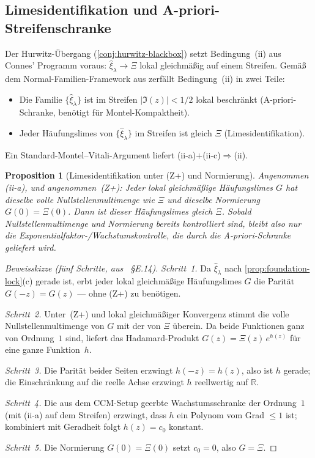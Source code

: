 \documentclass[12pt,a4paper]{article}
\newtheorem{proposition}[theorem]{Proposition}
\theoremstyle{definition}
\theoremstyle{remark}
\begin{document}
\subsection{Limesidentifikation und A-priori-Streifenschranke}
\label{subsec:iic-to-iia}

Der Hurwitz-Übergang (\cref{conj:hurwitz-blackbox}) setzt Bedingung~(ii)
aus Connes' Programm voraus: $\hat{\xi}_\lambda \to \Xi$ lokal gleichmäßig
auf einem Streifen. Gemäß dem Normal-Familien-Framework aus
\cite{Geiger2026evendom} zerfällt Bedingung~(ii) in zwei Teile:
\begin{itemize}
  \item[(ii-a)] Die Familie $\{\hat{\xi}_\lambda\}$ ist im Streifen
    $|\Im(z)| < 1/2$ lokal beschränkt (A-priori-Schranke, benötigt für
    Montel-Kompaktheit).
  \item[(ii-c)] Jeder Häufungslimes von $\{\hat{\xi}_\lambda\}$ im
    Streifen ist gleich $\Xi$ (Limesidentifikation).
\end{itemize}
Ein Standard-Montel--Vitali-Argument liefert (ii-a)$+$(ii-c)$\Rightarrow$(ii).

\begin{proposition}[Limesidentifikation unter (Z+) und Normierung]
\label{prop:iic-absorbed}
Angenommen (ii-a), und angenommen~\textup{(Z+)}: Jeder lokal gleichmäßige
Häufungslimes $G$ hat dieselbe volle Nullstellenmultimenge wie $\Xi$ und
dieselbe Normierung $G(0)=\Xi(0)$. Dann ist dieser Häufungslimes gleich
$\Xi$. Sobald Nullstellenmultimenge und Normierung bereits kontrolliert
sind, bleibt also nur die Exponentialfaktor-/Wachstumskontrolle, die durch
die A-priori-Schranke geliefert wird.
\end{proposition}

\begin{proof}[Beweissk\protect\nolinebreak izze (fünf Schritte, aus \cite{Geiger2026evendom}~§E.14)]
\emph{Schritt~1.} Da $\hat{\xi}_\lambda$ nach
\cref{prop:foundation-lock}(c) gerade ist, erbt jeder lokal gleichmäßige
Häufungslimes $G$ die Parität $G(-z)=G(z)$ --- ohne (Z+) zu benötigen.

\emph{Schritt~2.} Unter~(Z+) und lokal gleichmäßiger Konvergenz stimmt die
volle Nullstellenmultimenge von $G$ mit der von $\Xi$ überein. Da beide
Funktionen ganz von Ordnung~$1$ sind, liefert das Hadamard-Produkt
$G(z) = \Xi(z)\,e^{h(z)}$ für eine ganze Funktion~$h$.

\emph{Schritt~3.} Die Parität beider Seiten erzwingt $h(-z)=h(z)$, also ist
$h$ gerade; die Einschränkung auf die reelle Achse erzwingt $h$ reellwertig
auf $\mathbb{R}$.

\emph{Schritt~4.} Die aus dem CCM-Setup geerbte Wachstumsschranke der
Ordnung~$1$ (mit (ii-a) auf dem Streifen) erzwingt, dass $h$ ein Polynom vom
Grad $\le 1$ ist; kombiniert mit Geradheit folgt $h(z) = c_0$ konstant.

\emph{Schritt~5.} Die Normierung $G(0)=\Xi(0)$ setzt $c_0 = 0$, also
$G = \Xi$.
\end{proof}
\end{document}
